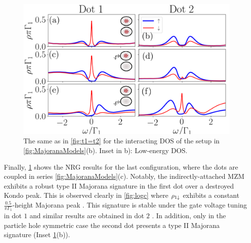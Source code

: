 




\begin{figure}[bt]
    \begin{center}
    \includegraphics[scale=0.41]{IMAGES/NRG/t2>0.png}
    \caption{  \label{fig:Nt2>0} The same as in \ref{fig:t1=t2} for the  interacting DOS of the setup in \ref{fig:MajoranaModels}(b). Inset in b): Low-energy DOS. \protect\Source{}
    }
    \end{center}
    \end{figure}



    Finally, \ref{fig:Nt2>0} shows the NRG results for the last configuration, where the dots are coupled in series \ref{fig:MajoranaModels}(c). Notably, the indirectly-attached MZM exhibits a robust type II Majorana signature in the first dot over a destroyed Kondo peak. This is observed clearly in  \ref{fig:logc} where $\rho_{1\downarrow}$ exhibits a constant $\frac{0.5}{\pi \Gamma_1}$-height Majorana peak  . This signature is stable under the gate voltage tuning in dot $1$ and similar results are obtained in dot $2$ . In addition, only  in the particle hole symmetric case the second dot presents a type II Majorana signature (Inset \ref{fig:Nt2>0}(b)). 

